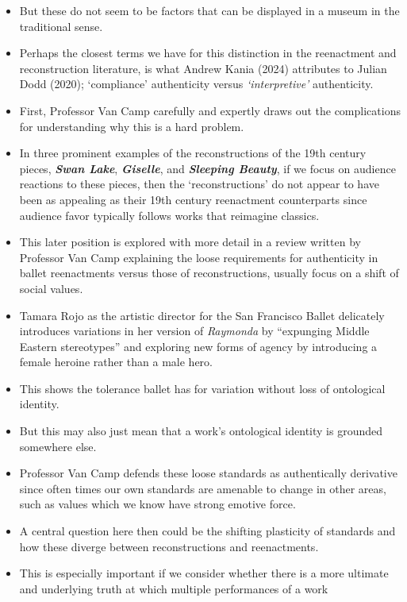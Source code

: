 \documentclass[
  letterpaper,
  DIV=11,
  numbers=noendperiod]{scrreprt}
\begin{document}
\begin{tcolorbox}[enhanced jigsaw, arc=.35mm, breakable, rightrule=.15mm, colback=white, colframe=quarto-callout-important-color-frame, bottomrule=.15mm, leftrule=.75mm, opacityback=0, toprule=.15mm, left=2mm]
\begin{tcolorbox}[enhanced jigsaw, arc=.35mm, breakable, rightrule=.15mm, colback=white, colframe=quarto-callout-tip-color-frame, bottomrule=.15mm, leftrule=.75mm, opacityback=0, toprule=.15mm, left=2mm]
\begin{itemize}
\item
  But these do not seem to be factors that can be displayed in a museum
  in the traditional sense.
\item
  Perhaps the closest terms we have for this distinction in the
  reenactment and reconstruction literature, is what Andrew Kania (2024)
  attributes to Julian Dodd (2020); `compliance' authenticity versus
  \emph{`interpretive'} authenticity.
\item
  First, Professor Van Camp carefully and expertly draws out the
  complications for understanding why this is a hard problem.
\item
  In three prominent examples of the reconstructions of the 19th century
  pieces, \textbf{\emph{Swan Lake}}, \textbf{\emph{Giselle}}, and
  \textbf{\emph{Sleeping Beauty}}, if we focus on audience reactions to
  these pieces, then the `reconstructions' do not appear to have been as
  appealing as their 19th century reenactment counterparts since
  audience favor typically follows works that reimagine classics.
\item
  This later position is explored with more detail in a review written
  by Professor Van Camp explaining the loose requirements for
  authenticity in ballet reenactments versus those of reconstructions,
  usually focus on a shift of social values.
\item
  Tamara Rojo as the artistic director for the San Francisco Ballet
  delicately introduces variations in her version of \emph{Raymonda} by
  ``expunging Middle Eastern stereotypes'' and exploring new forms of
  agency by introducing a female heroine rather than a male hero.
\item
  This shows the tolerance ballet has for variation without loss of
  ontological identity.
\item
  But this may also just mean that a work's ontological identity is
  grounded somewhere else.
\item
  Professor Van Camp defends these loose standards as authentically
  derivative since often times our own standards are amenable to change
  in other areas, such as values which we know have strong emotive
  force.
\item
  A central question here then could be the shifting plasticity of
  standards and how these diverge between reconstructions and
  reenactments.
\item
  This is especially important if we consider whether there is a more
  ultimate and underlying truth at which multiple performances of a work

\end{itemize}
\end{tcolorbox}
\end{tcolorbox}
\end{document}
